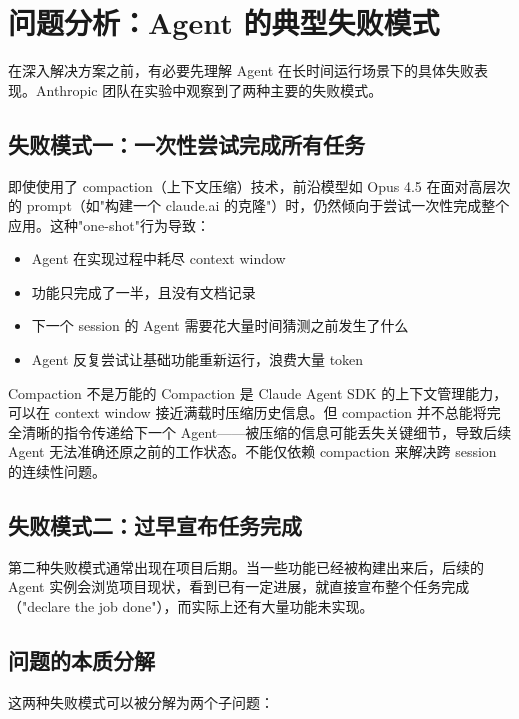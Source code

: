 \section{问题分析：Agent 的典型失败模式}

在深入解决方案之前，有必要先理解 Agent 在长时间运行场景下的具体失败表现。Anthropic 团队在实验中观察到了两种主要的失败模式。

\subsection{失败模式一：一次性尝试完成所有任务}

即使使用了 compaction（上下文压缩）技术，前沿模型如 Opus 4.5 在面对高层次的 prompt（如"构建一个 claude.ai 的克隆"）时，仍然倾向于尝试一次性完成整个应用。这种"one-shot"行为导致：

\begin{itemize}
    \item Agent 在实现过程中耗尽 context window
    \item 功能只完成了一半，且没有文档记录
    \item 下一个 session 的 Agent 需要花大量时间猜测之前发生了什么
    \item Agent 反复尝试让基础功能重新运行，浪费大量 token
\end{itemize}

\begin{warningbox}{Compaction 不是万能的}
Compaction 是 Claude Agent SDK 的上下文管理能力，可以在 context window 接近满载时压缩历史信息。但 compaction 并不总能将完全清晰的指令传递给下一个 Agent——被压缩的信息可能丢失关键细节，导致后续 Agent 无法准确还原之前的工作状态。不能仅依赖 compaction 来解决跨 session 的连续性问题。
\end{warningbox}

\subsection{失败模式二：过早宣布任务完成}

第二种失败模式通常出现在项目后期。当一些功能已经被构建出来后，后续的 Agent 实例会浏览项目现状，看到已有一定进展，就直接宣布整个任务完成（"declare the job done"），而实际上还有大量功能未实现。

\subsection{问题的本质分解}

这两种失败模式可以被分解为两个子问题：


